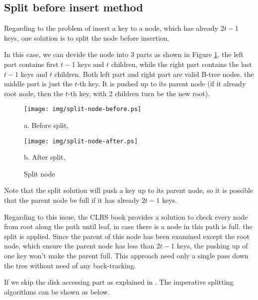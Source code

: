 \documentclass{article}
\begin{document}
\subsection{Split before insert method}
\label{split before insertion}

Regarding to the problem of insert a key to a node, which has already
$2t-1$ keys, one solution is to split the node before insertion.

In this case, we can devide the node into 3 parts as shown in 
Figure \ref{fig:node-split}. the left part contains first $t-1$ keys
and $t$ children, while the right part contains the last $t-1$ keys
and $t$ children. Both left part and right part are valid B-tree
nodes. the middle part is just the $t$-th key. It is pushed up
to its parent node (if it already root node, then the $t$-th key,
with 2 children turn be the new root).

\begin{figure}[htbp]
       \begin{center}
       	  \texttt{[image: img/split-node-before.ps]}

          a. Before split,

          \texttt{[image: img/split-node-after.ps]}

          b. After split, 
        \caption{Split node} \label{fig:node-split}
       \end{center}
\end{figure}

Note that the split solution will push a key up to its parent node,
so it is possible that the parent node be full if it has already 
$2t-1$ keys.

Regarding to this issue, the CLRS book provides a solution to check 
every node from root along the path until leaf, in case there is a 
node in this path is full. the split is applied. Since the parent
of this node has been examined except the root node, which ensure
the parent node has less than $2t-1$ keys, the pushing up of one
key won't make the parent full. This approach need only a single
pass down the tree without need of any back-tracking.

If we skip the disk accessing part as explained in \cite{CLRS}. The 
imperative splitting algorithms can be shown as below.

\end{document}
